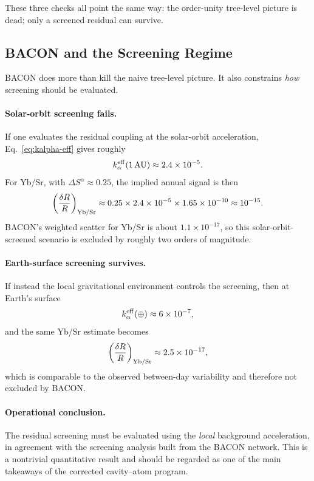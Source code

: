 These three checks all point the same way: the order-unity tree-level picture is dead; only a screened residual can survive.

\subsection{BACON and the Screening Regime}\label{sec:cavity-bacon}

BACON does more than kill the naive tree-level picture.  It also constrains \emph{how} screening should be evaluated.

\paragraph{Solar-orbit screening fails.}
If one evaluates the residual coupling at the solar-orbit acceleration, Eq.~\eqref{eq:kalpha-eff} gives roughly
\begin{equation}
k_\alpha^{\rm eff}(1\,\mathrm{AU})\approx 2.4\times10^{-5}.
\end{equation}
For Yb/Sr, with $\Delta S^\alpha\approx 0.25$, the implied annual signal is then
\begin{equation}
\left(\frac{\delta R}{R}\right)_{\rm Yb/Sr}\approx 0.25\times 2.4\times10^{-5}\times1.65\times10^{-10}
\approx 10^{-15}.
\end{equation}
BACON's weighted scatter for Yb/Sr is about $1.1\times10^{-17}$, so this solar-orbit-screened scenario is excluded by roughly two orders of magnitude.

\paragraph{Earth-surface screening survives.}
If instead the local gravitational environment controls the screening, then at Earth's surface
\begin{equation}
k_\alpha^{\rm eff}(\oplus)\approx 6\times10^{-7},
\end{equation}
and the same Yb/Sr estimate becomes
\begin{equation}
\left(\frac{\delta R}{R}\right)_{\rm Yb/Sr}\approx 2.5\times10^{-17},
\end{equation}
which is comparable to the observed between-day variability and therefore not excluded by BACON.

\paragraph{Operational conclusion.}
The residual screening must be evaluated using the \emph{local} background acceleration, in agreement with the screening analysis built from the BACON network.  This is a nontrivial quantitative result and should be regarded as one of the main takeaways of the corrected cavity--atom program.

